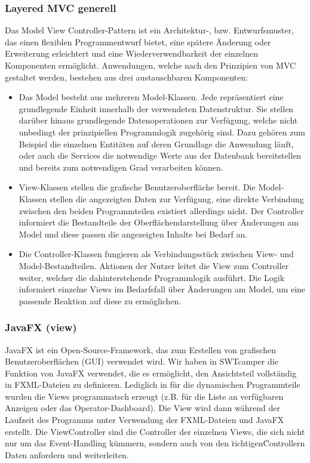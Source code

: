 \subsubsection{Layered MVC generell}
Das Model View Controller-Pattern ist ein Architektur-, bzw. Entwurfsmuster, das einen flexiblen Programmentwurf bietet, eine spätere Änderung oder Erweiterung erleichtert und eine Wiederverwendbarkeit der einzelnen Komponenten ermöglicht.
Anwendungen, welche nach den Prinzipien von MVC gestaltet werden, bestehen aus drei austauschbaren Komponenten: 

\begin{itemize}
	\item Das Model besteht aus mehreren Model-Klassen. Jede repräsentiert eine grundlegende Einheit innerhalb der verwendeten Datenstruktur. Sie stellen darüber hinaus grundlegende Datenoperationen zur Verfügung, welche nicht unbedingt der prinzipiellen Programmlogik zugehörig sind. Dazu gehören zum Beispiel die einzelnen Entitäten auf deren Grundlage die Anwendung läuft, oder auch die Services die notwendige Werte aus der Datenbank bereitstellen und bereits zum notwendigen Grad verarbeiten können.
	
	\item View-Klassen stellen die grafische Benutzeroberfläche bereit. Die Model-Klassen stellen die angezeigten Daten zur Verfügung, eine direkte Verbindung zwischen den beiden Programmteilen existiert allerdings nicht. Der Controller informiert die Bestandteile der Oberflächendarstellung über Änderungen am Model und diese passen die angezeigten Inhalte bei Bedarf an.
	
	\item Die Controller-Klassen fungieren als Verbindungsstück zwischen View- und Model-Bestandteilen. Aktionen der Nutzer leitet die View zum Controller weiter, welcher die dahinterstehende Programmlogik ausführt. Die Logik informiert einzelne Views im Bedarfsfall über Änderungen am Model, um eine passende Reaktion auf diese zu ermöglichen.
\end{itemize}

\subsubsection{JavaFX (view)}
JavaFX ist ein Open-Source-Framework, das zum Erstellen von grafischen Benutzeroberflächen (GUI) verwendet wird. Wir haben in SWTcamper die Funktion von JavaFX verwendet, die es ermöglicht, den Ansichtsteil vollständig in FXML-Dateien zu definieren. 
Lediglich in für die dynamischen Programmteile wurden die Views programmatsch erzeugt (z.B. für die Liste an verfügbaren Anzeigen oder das Operator-Dashboard). Die View wird dann während der Laufzeit des Programms unter Verwendung der FXML-Dateien und JavaFX erstellt. Die ViewController sind die Controller der einzelnen Views, die sich nicht nur um das Event-Handling kümmern, sondern auch von den \"richtigen\" Controllern Daten anfordern und weiterleiten.

